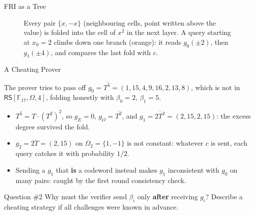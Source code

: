 \documentclass{zkdl-presentation-template}
\begin{document}
\begin{frame}{FRI as a Tree}
\begin{figure}
{%
            }
            \caption{Every pair $\{x, -x\}$ (neighbouring cells, point written above the value) is folded into the cell of $x^2$ in the next layer. A query starting at $x_0 = 2$ climbs down one branch (orange): it reads $g_0(\pm 2)$, then $g_1(\pm 4)$, and compares the last fold with $c$.}
        \end{figure}
    \end{frame}

    \begin{frame}{A Cheating Prover}
        \begin{example}
            The prover tries to pass off $g_0 = \overline{T^5} = (1, 15, 4, 9, 16, 2, 13, 8)$, which is not in $\mathsf{RS}[\mathbb{F}_{17}, \Omega, 4]$, folding honestly with $\beta_0 = 2$, $\beta_1 = 5$.
        \end{example}
        \pause
        \begin{itemize}
            \item $T^5 = T \cdot (T^2)^2$, so $g_E = 0$, $g_O = \overline{T^2}$, and $g_1 = \overline{2T^2} = (2, 15, 2, 15)$: the excess degree survived the fold.\pause
            \item $g_2 = \overline{2T} = (2, 15)$ on $\Omega_2 = \{1, -1\}$ is not constant: whatever $c$ is sent, each query catches it with probability $1/2$.\pause
            \item Sending a $g_1$ that \textbf{is} a codeword instead makes $g_1$ inconsistent with $g_0$ on many pairs: caught by the first round consistency check.
        \end{itemize}
        \pause

        \begin{questionblock}{Question \#2}
            Why must the verifier send $\beta_i$ only \textbf{after} receiving $g_i$? Describe a cheating strategy if all challenges were known in advance.
        \end{questionblock}
    \end{frame}
\end{document}
